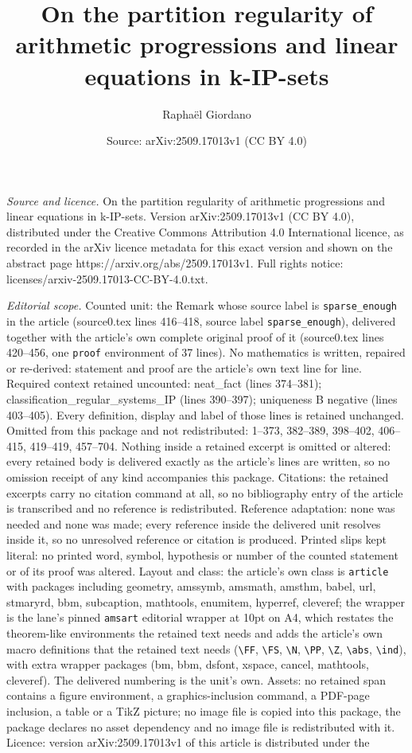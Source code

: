 \documentclass[10pt,a4paper]{amsart}
\title[On the partition regularity of arithmetic progressions and l]{On the partition regularity of arithmetic progressions and linear equations in k-IP-sets}
\author{Rapha\"el Giordano}
\date{Source: arXiv:2509.17013v1 (CC BY 4.0)}
\begin{document}
\maketitle

\noindent\emph{Source and licence.} On the partition regularity of arithmetic progressions and linear equations in k-IP-sets. Version arXiv:2509.17013v1 (CC BY 4.0), distributed under the Creative Commons Attribution 4.0 International licence, as recorded in the arXiv licence metadata for this exact version and shown on the abstract page https://arxiv.org/abs/2509.17013v1. Full rights notice: licenses/arxiv-2509.17013-CC-BY-4.0.txt.\par\smallskip

\noindent\textit{Editorial scope.} Counted unit: the Remark whose source label is \texttt{sparse\_enough} in the article (source0.tex lines 416--418, source label \texttt{sparse\_enough}), delivered together with the article's own complete original proof of it (source0.tex lines 420--456, one \texttt{proof} environment of 37 lines). No mathematics is written, repaired or re-derived: statement and proof are the article's own text line for line. Required context retained uncounted: neat\_fact (lines 374--381); classification\_regular\_systems\_IP (lines 390--397); uniqueness B negative (lines 403--405). Every definition, display and label of those lines is retained unchanged. Omitted from this package and not redistributed: 1--373, 382--389, 398--402, 406--415, 419--419, 457--704. Nothing inside a retained excerpt is omitted or altered: every retained body is delivered exactly as the article's lines are written, so no omission receipt of any kind accompanies this package. Citations: the retained excerpts carry no citation command at all, so no bibliography entry of the article is transcribed and no reference is redistributed. Reference adaptation: none was needed and none was made; every reference inside the delivered unit resolves inside it, so no unresolved reference or citation is produced. Printed slips kept literal: no printed word, symbol, hypothesis or number of the counted statement or of its proof was altered. Layout and class: the article's own class is \texttt{article} with packages including geometry, amssymb, amsmath, amsthm, babel, url, stmaryrd, bbm, subcaption, mathtools, enumitem, hyperref, cleveref; the wrapper is the lane's pinned \texttt{amsart} editorial wrapper at 10pt on A4, which restates the theorem-like environments the retained text needs and adds the article's own macro definitions that the retained text needs (\texttt{\textbackslash FF}, \texttt{\textbackslash FS}, \texttt{\textbackslash N}, \texttt{\textbackslash PP}, \texttt{\textbackslash Z}, \texttt{\textbackslash abs}, \texttt{\textbackslash ind}), with extra wrapper packages (bm, bbm, dsfont, xspace, cancel, mathtools, cleveref). The delivered numbering is the unit's own. Assets: no retained span contains a figure environment, a graphics-inclusion command, a PDF-page inclusion, a table or a TikZ picture; no image file is copied into this package, the package declares no asset dependency and no image file is redistributed with it. Licence: version arXiv:2509.17013v1 of this article is distributed under the 
\end{document}
